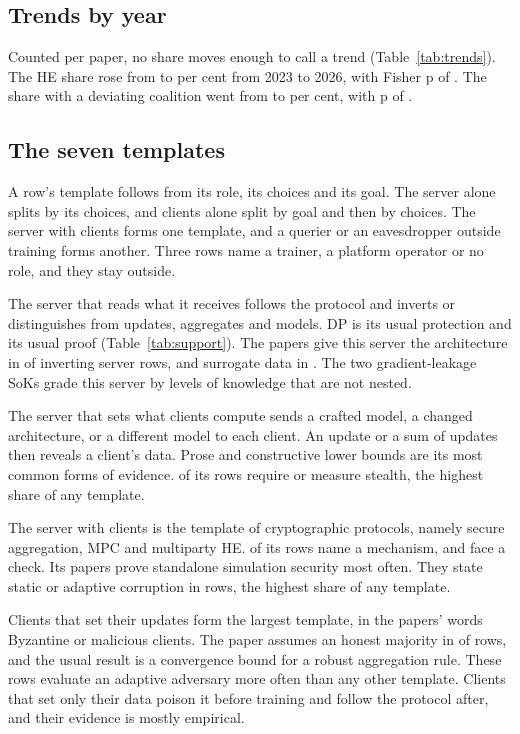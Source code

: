 \documentclass{labreport}
\newcommand{\T}[1]{}
\begin{document}
\T{papers-a}
\T{papers-b}

\subsection*{Trends by year}
Counted per paper, no share moves enough to call a trend
(Table~\ref{tab:trends}). The HE share rose from  to 
per cent from 2023 to 2026, with Fisher p of . The share with a
deviating coalition went from  to  per cent, with p
of .

\T{trends}

\subsection*{The seven templates}
A row's template follows from its role, its choices and its goal. The server
alone splits by its choices, and clients alone split by goal and then by
choices. The server with clients forms one template, and a querier or an
eavesdropper outside training forms another. Three rows name a trainer, a
platform operator or no role, and they stay outside.

The server that reads what it receives follows the protocol and inverts or
distinguishes from updates, aggregates and models. DP is its usual protection
and its usual proof (Table~\ref{tab:support}). The papers give this server the
architecture in  of  inverting server rows,
and surrogate data in . The two gradient-leakage SoKs
grade this server by levels of knowledge that are not nested.

The server that sets what clients compute sends a crafted model, a changed
architecture, or a different model to each client. An update or a sum of
updates then reveals a client's data. Prose and constructive lower bounds are its most
common forms of evidence.  of its  rows
require or measure stealth, the highest share of any template.

The server with clients is the template of cryptographic protocols, namely
secure aggregation, MPC and multiparty HE.  of its  rows
name a mechanism, and  face a check. Its papers prove standalone
simulation security most often. They state static or adaptive corruption in
 rows, the highest share of any template.

Clients that set their updates form the largest template, in the papers' words
Byzantine or malicious clients. The paper assumes an honest majority in
 of  rows, and the usual result is a convergence bound
for a robust aggregation rule. These rows evaluate an adaptive adversary more
often than any other template. Clients that set only their data poison it
before training and follow the protocol after, and their evidence is mostly
empirical.
\end{document}
